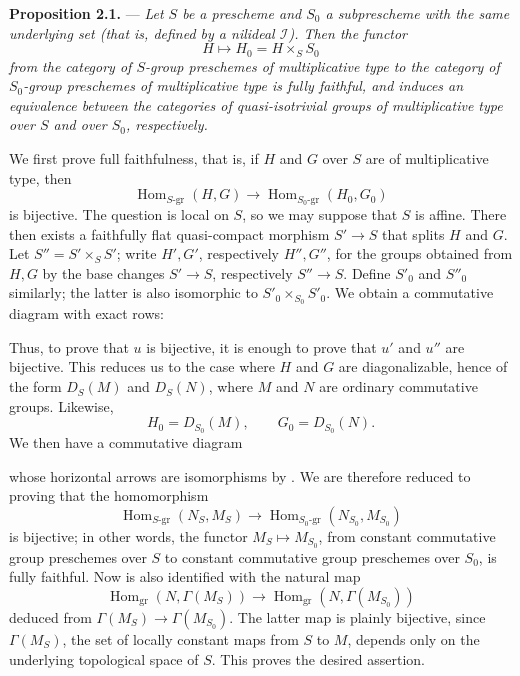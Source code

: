 \medskip
\noindent{}%
\textbf{Proposition 2.1.} ---
\textit{Let \(S\) be a prescheme and \(S_0\) a subprescheme with the
same underlying set (that is, defined by a nilideal \(\mathscr I\)).
Then the functor
\[
  H\longmapsto H_0=H\times_S S_0
\]
from the category of \(S\)-group preschemes of multiplicative type to
the category of \(S_0\)-group preschemes of multiplicative type is
fully faithful, and induces an equivalence between the categories of
quasi-isotrivial groups of multiplicative type over \(S\) and over
\(S_0\), respectively.}

We first prove full faithfulness, that is, if \(H\) and \(G\) over
\(S\) are of multiplicative type, then
\[
  \operatorname{Hom}_{S\text{-}\mathrm{gr}}(H,G)
  \longrightarrow
  \operatorname{Hom}_{S_0\text{-}\mathrm{gr}}(H_0,G_0)
\]
is bijective. The question is local on \(S\), so we may suppose that
\(S\) is affine. There then exists a faithfully flat quasi-compact
morphism \(S'\to S\) that splits \(H\) and \(G\). Let
\(S''=S'\times_S S'\); write \(H',G'\), respectively \(H'',G''\), for
the groups obtained from \(H,G\) by the base changes \(S'\to S\),
respectively \(S''\to S\). Define \(S'_0\) and \(S''_0\) similarly;
the latter is also isomorphic to \(S'_0\times_{S_0}S'_0\). We obtain a
commutative diagram with exact rows:
\begin{center}
  
\end{center}
Thus, to prove that \(u\) is bijective, it is enough to prove that
\(u'\) and \(u''\) are bijective. This reduces us to the case where
\(H\) and \(G\) are diagonalizable, hence of the form \(D_S(M)\) and
\(D_S(N)\), where \(M\) and \(N\) are ordinary commutative groups.
Likewise,
\[
  H_0=D_{S_0}(M),\qquad G_0=D_{S_0}(N).
\]
We then have a commutative diagram
\begin{center}
  
\end{center}
whose horizontal arrows are isomorphisms by . We are therefore
reduced to proving that the homomorphism
\begin{equation}
  \operatorname{Hom}_{S\text{-}\mathrm{gr}}(N_S,M_S)
  \longrightarrow
  \operatorname{Hom}_{S_0\text{-}\mathrm{gr}}(N_{S_0},M_{S_0})
  \tag{x}\label{sga3:x:proposition:2-1:equation:x}
\end{equation}
is bijective; in other words, the functor
\(M_S\mapsto M_{S_0}\), from constant commutative group preschemes
over \(S\) to constant commutative group preschemes over \(S_0\), is
fully faithful. Now  is also identified with the natural map
\[
  \operatorname{Hom}_{\mathrm{gr}}(N,\Gamma(M_S))
  \longrightarrow
  \operatorname{Hom}_{\mathrm{gr}}(N,\Gamma(M_{S_0}))
\]
deduced from \(\Gamma(M_S)\to\Gamma(M_{S_0})\). The latter map is
plainly bijective, since \(\Gamma(M_S)\), the set of locally constant
maps from \(S\) to \(M\), depends only on the underlying topological
space of \(S\). This proves the desired assertion.

